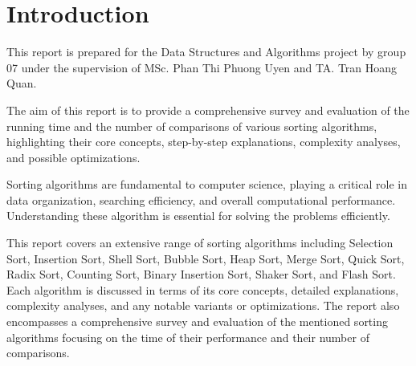 \section{Introduction}

This report is prepared for the Data Structures and Algorithms project by group 07 under the supervision of MSc. Phan Thi Phuong Uyen and TA. Tran Hoang Quan.

\vspace{10pt}

The aim of this report is to provide a comprehensive survey and evaluation of  the running time and the number of comparisons of various sorting algorithms, highlighting their core concepts, step-by-step explanations, complexity analyses, and possible optimizations.

\vspace{10pt}

Sorting algorithms are fundamental to computer science, playing a critical role in data organization, searching efficiency, and overall computational performance. Understanding these algorithm is essential for solving the problems efficiently.

\vspace{10pt}

This report covers an extensive range of sorting algorithms including Selection Sort, Insertion Sort, Shell Sort, Bubble Sort, Heap Sort, Merge Sort, Quick Sort, Radix Sort, Counting Sort, Binary Insertion Sort, Shaker Sort, and Flash Sort. Each algorithm is discussed in terms of its core concepts, detailed explanations, complexity analyses, and any notable variants or optimizations. The report also encompasses a comprehensive survey and evaluation of the mentioned sorting algorithms focusing on the time of their performance and their number of comparisons.
